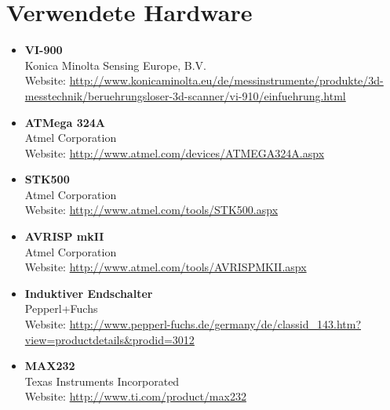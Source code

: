 \section{Verwendete Hardware}
\label{sec:V_Hardware}
\begin{itemize}
\item \textbf{VI-900}\\
Konica Minolta Sensing Europe, B.V.\\
Website: \url{http://www.konicaminolta.eu/de/messinstrumente/produkte/3d-messtechnik/beruehrungsloser-3d-scanner/vi-910/einfuehrung.html}
\item \textbf{ATMega 324A}\\
 Atmel Corporation\\
Website: \url{http://www.atmel.com/devices/ATMEGA324A.aspx}
\item \textbf{STK500}\\
 Atmel Corporation\\
Website: \url{http://www.atmel.com/tools/STK500.aspx}
\item \textbf{AVRISP mkII}\\
 Atmel Corporation\\
 Website: \url{http://www.atmel.com/tools/AVRISPMKII.aspx}
\item \textbf{Induktiver Endschalter}\\
 Pepperl+Fuchs\\
 Website: \url{http://www.pepperl-fuchs.de/germany/de/classid_143.htm?view=productdetails&prodid=3012}
\item \textbf{MAX232}\\
 Texas Instruments Incorporated\\
 Website: \url{http://www.ti.com/product/max232}
\end{itemize}

